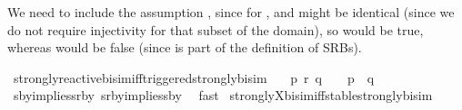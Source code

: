 \begin{isabellebody}
\begin{isamarkuptext}
We need to include the assumption , since for \linebreak {},  and  might be identical (since we do not require injectivity for that subset of the domain), so  would be true, whereas  would be false (since \linebreak {} is part of the definition of SRBs).%
\end{isamarkuptext}\isamarkuptrue%
%
\isadelimdocument
%
\endisadelimdocument
%
\isatagdocument
%
\isamarkuptrue%
%
\endisatagdocument
{\isafolddocument}%
%
\isadelimdocument
%
\endisadelimdocument
%
\isadelimvisible
%
\endisadelimvisible
%
\isatagvisible
{}\isamarkupfalse%
\ strongly{\isacharunderscore}{\kern0pt}reactive{\isacharunderscore}{\kern0pt}bisim{\isacharunderscore}{\kern0pt}iff{\isacharunderscore}{\kern0pt}triggered{\isacharunderscore}{\kern0pt}strongly{\isacharunderscore}{\kern0pt}bisim{\isacharcolon}{\kern0pt}\isanewline
\ \ \ {\isacartoucheopen}p\ {\isasymleftrightarrow}\isactrlsub r\ q\ \ {\isasymLongleftrightarrow}\ \ {\isasymtheta}{\isacharparenleft}{\kern0pt}p{\isacharparenright}{\kern0pt}\ {\isasymleftrightarrow}\ {\isasymtheta}{\isacharparenleft}{\kern0pt}q{\isacharparenright}{\kern0pt}{\isacartoucheclose}\isanewline
\ \ \isamarkupfalse%
\ sby{\isacharunderscore}{\kern0pt}implies{\isacharunderscore}{\kern0pt}srby\ srby{\isacharunderscore}{\kern0pt}implies{\isacharunderscore}{\kern0pt}sby\ \isamarkupfalse%
\ fast\isanewline
\isanewline
{}\isamarkupfalse%
\ strongly{\isacharunderscore}{\kern0pt}X{\isacharunderscore}{\kern0pt}bisim{\isacharunderscore}{\kern0pt}iff{\isacharunderscore}{\kern0pt}stable{\isacharunderscore}{\kern0pt}strongly{\isacharunderscore}{\kern0pt}bisim{\isacharcolon}{\kern0pt}\isanewline

\end{isabellebody}
